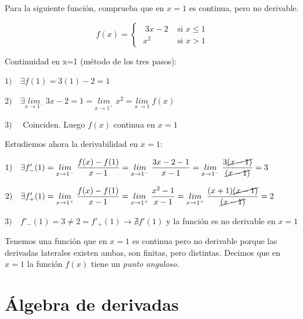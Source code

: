 	\begin{ejem} Para la siguiente función, comprueba que en $x=1$ es continua, pero no derivable.
	
	\begin{equation*}
		f(x)=
		\begin{cases} 
		\;\;  3x-2 &\mbox{ si } x\le 1 \\ 
		\; x^2 & \mbox{ si } x>1 
		\end{cases}
	\end{equation*}
	
	Continuidad en x=1 (método de los tres pasos):
	
	$1) \quad \exists f(1)=3(1)-2=1$
	
	$2) \quad \exists \underset{x\to 1^-}{lim}\;{3x-2}=1=\underset{x\to 1^+}{lim}\;{x^2}=\underset{x\to 1}{lim}\;{f(x)}$
	
	$3) \quad $ Coinciden. Luego $f(x)$ continua en $x=1$
	
	Estudiemos ahora la derivabilidad en $x=1$:
	
	$1) \quad \exists f'_-(1)=\underset {x\to 1^-}{lim}\;{\dfrac {f(x)-f(1)}{x-1}}=\underset {x\to 1^-}{lim}\;{\dfrac {3x-2-1}{x-1}}=\underset {x\to 1^-}{lim}\;{\dfrac {3\cancel{(x-1)}}{\cancel{(x-1)}}}=3$
	
	$2) \quad \exists f'_+(1)=\underset {x\to 1^+}{lim}\;{\dfrac {f(x)-f(1)}{x-1}}= \underset {x\to 1^+}{lim}\;{\dfrac {x^2-1}{x-1}}=\underset {x\to 1^+}{lim}\;{\dfrac {(x+1)\cancel{(x-1)}}{\cancel{(x-1)}}}=2$
	
	$3) \quad f'_-(1)=3\neq 2=f'_+(1) \to \nexists f'(1)$ y la función es no derivable en $x=1$
	
	Tenemos una función que en $x=1$ es continua pero no derivable porque las derivadas laterales existen ambas, son finitas, pero distintas. Decimos que en $x=1$ la función $f(x)$ tiene un \emph{punto anguloso.}
	\end{ejem}
	
	\section{Álgebra de derivadas}
	
